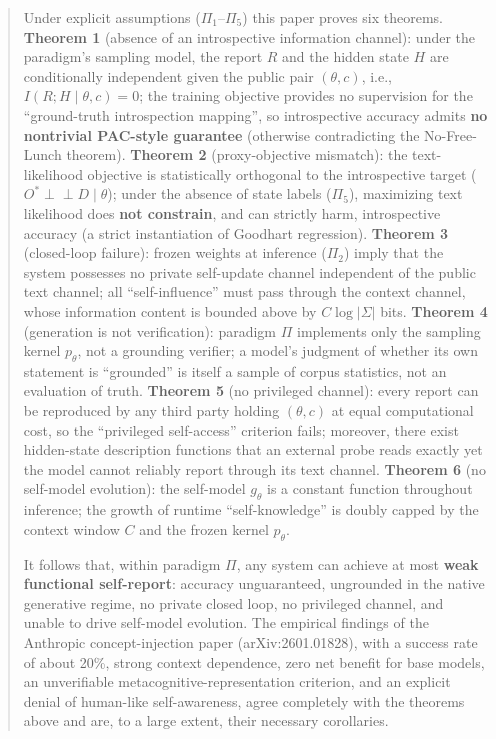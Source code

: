 \documentclass[a4paper]{article}
\newcommand{\abs}[1]{\left\lvert #1 \right\rvert}
\newcommand{\indep}{\perp\!\!\!\perp}
\theoremstyle{cnplain}
\theoremstyle{cndef}
\begin{document}
\begin{abstract}
\medskip
\noindent Under explicit assumptions ($\Pi_1$--$\Pi_5$) this paper proves six theorems.
\textbf{Theorem 1} (absence of an introspective information channel): under the paradigm's
sampling model, the report $R$ and the hidden state $H$ are conditionally independent given
the public pair $(\theta,c)$, i.e., $I(R;H\mid\theta,c)=0$; the training objective provides
no supervision for the ``ground-truth introspection mapping'', so introspective accuracy admits
\textbf{no nontrivial PAC-style guarantee} (otherwise contradicting the No-Free-Lunch
theorem). \textbf{Theorem 2} (proxy-objective mismatch): the text-likelihood objective is
statistically orthogonal to the introspective target ($O^{*} \indep D \mid \theta$); under
the absence of state labels ($\Pi_5$), maximizing text likelihood does \textbf{not
constrain}, and can strictly harm, introspective accuracy (a strict instantiation of Goodhart
regression). \textbf{Theorem 3} (closed-loop failure): frozen weights at inference ($\Pi_2$)
imply that the system possesses no private self-update channel independent of the public text
channel; all ``self-influence'' must pass through the context channel, whose information content
is bounded above by $C\log\abs{\Sigma}$ bits. \textbf{Theorem 4} (generation is not
verification): paradigm $\Pi$ implements only the sampling kernel $p_\theta$, not a grounding
verifier; a model's judgment of whether its own statement is ``grounded'' is itself a sample of
corpus statistics, not an evaluation of truth. \textbf{Theorem 5} (no privileged channel):
every report can be reproduced by any third party holding $(\theta,c)$ at equal computational
cost, so the ``privileged self-access'' criterion fails; moreover, there exist hidden-state
description functions that an external probe reads exactly yet the model cannot reliably
report through its text channel. \textbf{Theorem 6} (no self-model evolution): the self-model
$g_\theta$ is a constant function throughout inference; the growth of runtime
``self-knowledge'' is doubly capped by the context window $C$ and the frozen kernel $p_\theta$.

\medskip
\noindent It follows that, within paradigm $\Pi$, any system can achieve at most \textbf{weak
functional self-report}: accuracy unguaranteed, ungrounded in the native generative regime,
no private closed loop, no privileged channel, and unable to drive self-model evolution. The
empirical findings of the Anthropic concept-injection paper (arXiv:2601.01828), with a
success rate of about 20\%, strong context dependence, zero net benefit for base models, an
unverifiable metacognitive-representation criterion, and an explicit denial of human-like
self-awareness, agree completely with the theorems above and are, to a large extent, their
necessary corollaries.


\end{abstract}
\end{document}
